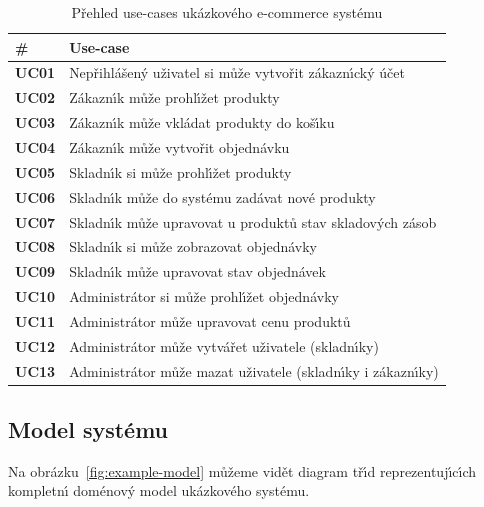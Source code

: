 \begin{table}
    \centering
    \begin{tabular*}{\textwidth}{ l l }
        \hline
        \textbf{\#} & \textbf{Use-case} \\
        \hline \hline
        \textbf{UC01} & Nepřihlášen\'y uživatel si může vytvořit zákazn\'{\i}ck\'y účet \\
        \textbf{UC02} & Zákazn\'{\i}k může prohl\'{\i}žet produkty \\
        \textbf{UC03} & Zákazn\'{\i}k může vkládat produkty do koš\'{\i}ku \\
        \textbf{UC04} & Zákazn\'{\i}k může vytvořit objednávku \\
        \textbf{UC05} & Skladn\'{\i}k si může prohl\'{\i}žet produkty \\
        \textbf{UC06} & Skladn\'{\i}k může do systému zadávat nové produkty \\
        \textbf{UC07} & Skladn\'{\i}k může upravovat u produktů stav skladov\'ych zásob \\
        \textbf{UC08} & Skladn\'{\i}k si může zobrazovat objednávky \\
        \textbf{UC09} & Skladn\'{\i}k může upravovat stav objednávek \\
        \textbf{UC10} & Administrátor si může prohl\'{\i}žet objednávky \\
        \textbf{UC11} & Administrátor může upravovat cenu produktů \\
        \textbf{UC12} & Administrátor může vytvářet uživatele (skladn\'{\i}ky) \\
        \textbf{UC13} & Administrátor může mazat uživatele (skladn\'{\i}ky i zákazn\'{\i}ky) \\
        \hline
    \end{tabular*}
    \caption{Přehled use-cases ukázkového e-commerce systému}
    \label{tbl:use-cases}
\end{table}

\subsection{Model systému}

Na obrázku~\ref{fig:example-model} můžeme vidět diagram tř\'{\i}d reprezentuj\'{\i}c\'{\i}ch
kompletn\'{\i} doménov\'y model ukázkového systému.

